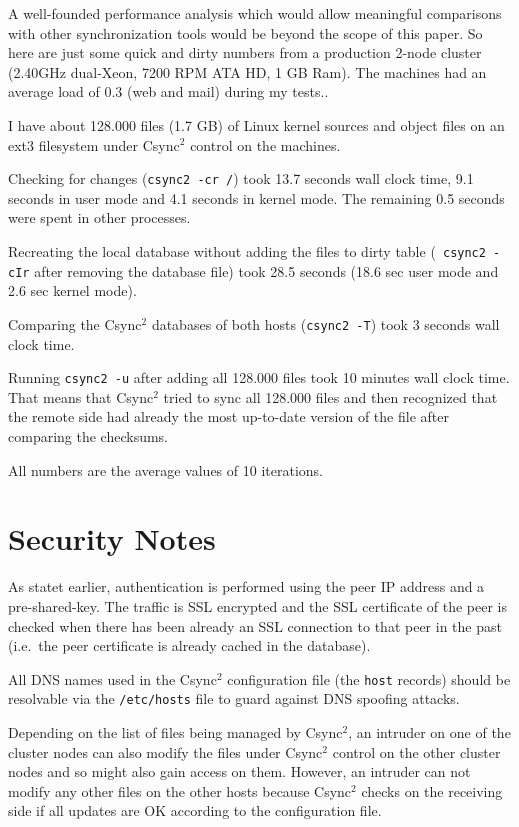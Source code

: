 \documentclass[a4paper,twocolumn]{article}
\def\csync2{{\sc Csync$^{2}$}}
\begin{document}
A well-founded performance analysis which would allow meaningful comparisons
with other synchronization tools would be beyond the scope of this paper.
So here are just some quick and dirty numbers from a production
2-node cluster (2.40GHz dual-Xeon, 7200 RPM ATA HD, 1 GB Ram). The machines
had an average load of 0.3 (web and mail) during my tests..

I have about 128.000 files (1.7 GB) of Linux kernel sources and object
files on an ext3 filesystem under \csync2 control on the machines.

Checking for changes ({\tt csync2 -cr /}) took 13.7 seconds wall clock time,
9.1 seconds in user mode and 4.1 seconds in kernel mode. The remaining 0.5
seconds were spent in other processes.

Recreating the local database without adding the files to dirty table ({\tt
csync2 -cIr} after removing the database file) took 28.5 seconds (18.6 sec
user mode and 2.6 sec kernel mode). 

Comparing the \csync2 databases of both hosts ({\tt csync2 -T}) took 3 seconds
wall clock time.

Running {\tt csync2 -u} after adding all 128.000 files took 10 minutes wall
clock time. That means that \csync2 tried to sync all 128.000 files and then
recognized that the remote side had already the most up-to-date version of
the file after comparing the checksums.

All numbers are the average values of 10 iterations.

\section{Security Notes}

As statet earlier, authentication is performed using the peer IP address and a
pre-shared-key. The traffic is SSL encrypted and the SSL certificate of the
peer is checked when there has been already an SSL connection to that peer in
the past (i.e.~the peer certificate is already cached in the database).

All DNS names used in the \csync2 configuration file (the {\tt host} records)
should be resolvable via the {\tt /etc/hosts} file to guard against DNS
spoofing attacks.

Depending on the list of files being managed by \csync2, an intruder on one of
the cluster nodes can also modify the files under \csync2 control on the other
cluster nodes and so might also gain access on them. However, an intruder can
not modify any other files on the other hosts because \csync2 checks on the
receiving side if all updates are OK according to the configuration file.
\end{document}
